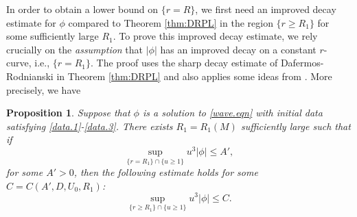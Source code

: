 \documentclass[12 pt, reqno]{amsart}
\newtheorem{proposition}[theorem]{Proposition}
\theoremstyle{definition}
\theoremstyle{remark}
\numberwithin{equation}{section}
\newcommand{\set}[1]{\{#1\}}
\newcommand{\0}{\emptyset}
\begin{document}
In order to obtain a lower bound on $\{r=R\}$, we first need an improved decay estimate for $\phi$ compared to Theorem \ref{thm:DRPL} in the region $\{r\geq R_1\}$ for some sufficiently large $R_1$. To prove this improved decay estimate, we rely crucially on the \emph{assumption} that $|\phi|$ has an improved decay on a constant $r$-curve, i.e., $\{r=R_1\}$. The proof uses the sharp decay estimate of Dafermos-Rodnianski in Theorem \ref{thm:DRPL} and also applies some ideas from \cite{LO1}. More precisely, we have
\begin{proposition}\label{imp.decay}
Suppose that $\phi$ is a solution to \eqref{wave.eqn} with initial data satisfying \eqref{data.1}-\eqref{data.3}.
There exists $R_1=R_1(M)$ sufficiently large such that if
$$\sup_{\set{r= R_1} \cap \set{u \geq 1}} u^3|\phi|\leq A',$$
for some $A'>0$, then the following estimate holds for some $C=C(A',D,U_0,R_1)$:
$$ \sup_{\set{r\geq R_1} \cap \set{u \geq 1}} u^3|\phi|\leq C. $$
\end{proposition}
\end{document}
